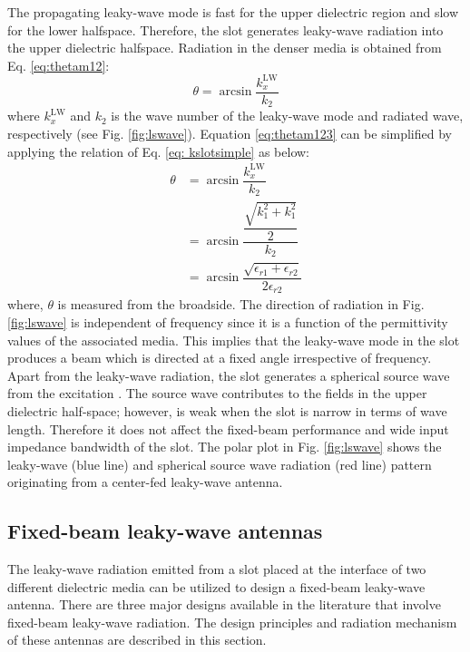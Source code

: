 The propagating leaky-wave mode is fast for the upper dielectric region and slow for the lower halfspace. Therefore, the slot generates leaky-wave radiation into the upper dielectric halfspace. Radiation in the denser media is obtained from Eq. \ref{eq:thetam12}:
\begin{equation} \label{eq:thetam123}
	\theta = \arcsin \dfrac{k_x^{\mathrm{LW}}}{k_2}
\end{equation}
where $k_x^{\mathrm{LW}}$ and $k_2$ is the wave number of the leaky-wave mode and radiated wave, respectively (see Fig. \ref{fig:lswave}). Equation \ref{eq:thetam123} can be simplified by applying the relation of Eq. \ref{eq: kslotsimple} as below:
%
\begin{subequations} 
	\begin{align}
		\theta & = \arcsin \dfrac{k_x^{\mathrm{LW}}}{k_2} \\
		& = \arcsin \dfrac{\dfrac{\sqrt{k_1^2+k_1^2}}{2}}{k_2} \\
		& = \arcsin \dfrac{\sqrt {\epsilon_{r1} + \epsilon_{r2}}}{2 \epsilon_{r2}} \label{eq:slottheta}
	\end{align}
\end{subequations}
where, ${\theta}$ is measured from the broadside. The direction of radiation in Fig. \ref{fig:lswave} is independent of frequency since it is a function of the permittivity values of the associated media. This implies that the leaky-wave mode in the slot produces a beam which is directed at a fixed angle irrespective of frequency. Apart from the leaky-wave radiation, the slot generates a spherical source wave from the excitation \cite{Maci2004}. The source wave contributes to the fields in the upper dielectric half-space; however, is weak when the slot is narrow in terms of wave length. Therefore it does not affect the fixed-beam performance and wide input impedance bandwidth of the slot. The polar plot in Fig. \ref{fig:lswave}  shows the leaky-wave (blue line) and spherical source wave radiation (red line) pattern originating from a  center-fed leaky-wave antenna.



\subsection{Fixed-beam leaky-wave antennas}

The leaky-wave radiation emitted from a slot placed at the interface of two different dielectric media can be utilized to design a fixed-beam leaky-wave antenna. There are three major designs available in the literature that involve fixed-beam leaky-wave radiation. The design principles and radiation mechanism of these antennas are described in this section.

